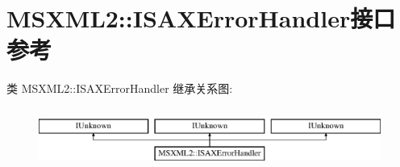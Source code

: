 \hypertarget{interface_m_s_x_m_l2_1_1_i_s_a_x_error_handler}{}\section{M\+S\+X\+M\+L2\+:\+:I\+S\+A\+X\+Error\+Handler接口 参考}
\label{interface_m_s_x_m_l2_1_1_i_s_a_x_error_handler}
类 M\+S\+X\+M\+L2\+:\+:I\+S\+A\+X\+Error\+Handler 继承关系图\+:\begin{figure}[H]
\begin{center}
\leavevmode
\includegraphics[height=2.000000cm]{interface_m_s_x_m_l2_1_1_i_s_a_x_error_handler}
\end{center}
\end{figure}
